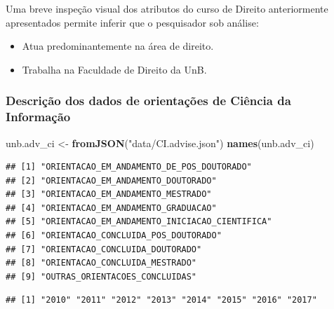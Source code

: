\documentclass[]{article}
\newenvironment{Shaded}{\begin{snugshade}}{\end{snugshade}}
\newcommand{\KeywordTok}[1]{\textcolor[rgb]{0.13,0.29,0.53}{\textbf{#1}}}
\newcommand{\DataTypeTok}[1]{\textcolor[rgb]{0.13,0.29,0.53}{#1}}
\newcommand{\StringTok}[1]{\textcolor[rgb]{0.31,0.60,0.02}{#1}}
\newcommand{\OperatorTok}[1]{\textcolor[rgb]{0.81,0.36,0.00}{\textbf{#1}}}
\newcommand{\NormalTok}[1]{#1}
\providecommand{\tightlist}{%
  \setlength{\itemsep}{0pt}\setlength{\parskip}{0pt}}
\begin{document}
Uma breve inspeção visual dos atributos do curso de Direito
anteriormente apresentados permite inferir que o pesquisador sob
análise:

\begin{itemize}
\tightlist
\item
  Atua predominantemente na área de direito.
\item
  Trabalha na Faculdade de Direito da UnB.
\end{itemize}

\subsubsection{Descrição dos dados de orientações de Ciência da
Informação}\label{descricao-dos-dados-de-orientacoes-de-ciencia-da-informacao}

\begin{Shaded}
\begin{Highlighting}[]
\NormalTok{unb.adv_ci <-}\StringTok{ }\KeywordTok{fromJSON}\NormalTok{(}\StringTok{"data/CI.advise.json"}\NormalTok{)}
\KeywordTok{names}\NormalTok{(unb.adv_ci)}
\end{Highlighting}
\end{Shaded}

\begin{verbatim}
## [1] "ORIENTACAO_EM_ANDAMENTO_DE_POS_DOUTORADO"    
## [2] "ORIENTACAO_EM_ANDAMENTO_DOUTORADO"           
## [3] "ORIENTACAO_EM_ANDAMENTO_MESTRADO"            
## [4] "ORIENTACAO_EM_ANDAMENTO_GRADUACAO"           
## [5] "ORIENTACAO_EM_ANDAMENTO_INICIACAO_CIENTIFICA"
## [6] "ORIENTACAO_CONCLUIDA_POS_DOUTORADO"          
## [7] "ORIENTACAO_CONCLUIDA_DOUTORADO"              
## [8] "ORIENTACAO_CONCLUIDA_MESTRADO"               
## [9] "OUTRAS_ORIENTACOES_CONCLUIDAS"
\end{verbatim}

\begin{Shaded}
\end{Shaded}

\begin{verbatim}
## [1] "2010" "2011" "2012" "2013" "2014" "2015" "2016" "2017"
\end{verbatim}

\begin{Shaded}
\end{Shaded}
\end{document}
